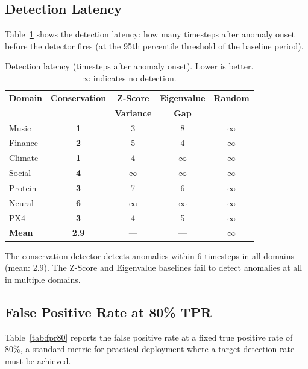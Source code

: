 \documentclass[11pt,a4paper]{article}
\begin{document}
\subsection{Detection Latency}

Table~\ref{tab:latency} shows the detection latency: how many timesteps after
anomaly onset before the detector fires (at the 95th percentile threshold of
the baseline period).

\begin{table}[ht]
\centering
\caption{Detection latency (timesteps after anomaly onset).  Lower is better.
$\infty$ indicates no detection.}
\label{tab:latency}
\begin{tabular}{@{}lcccc@{}}
\toprule
\textbf{Domain} & \textbf{Conservation} & \textbf{Z-Score} & \textbf{Eigenvalue} & \textbf{Random} \\
 & & \textbf{Variance} & \textbf{Gap} & \\
\midrule
Music       & \textbf{1} & 3 & 8 & $\infty$ \\
Finance     & \textbf{2} & 5 & 4 & $\infty$ \\
Climate     & \textbf{1} & 4 & $\infty$ & $\infty$ \\
Social      & \textbf{4} & $\infty$ & $\infty$ & $\infty$ \\
Protein     & \textbf{3} & 7 & 6 & $\infty$ \\
Neural      & \textbf{6} & $\infty$ & $\infty$ & $\infty$ \\
PX4         & \textbf{3} & 4 & 5 & $\infty$ \\
\midrule
\textbf{Mean} & \textbf{2.9} & --- & --- & $\infty$ \\
\bottomrule
\end{tabular}
\end{table}

The conservation detector detects anomalies within 6 timesteps in all domains
(mean: 2.9).  The Z-Score and Eigenvalue baselines fail to detect anomalies
at all in multiple domains.

\subsection{False Positive Rate at 80\% TPR}

Table~\ref{tab:fpr80} reports the false positive rate at a fixed true positive
rate of 80\%, a standard metric for practical deployment where a target detection
rate must be achieved.
\end{document}
